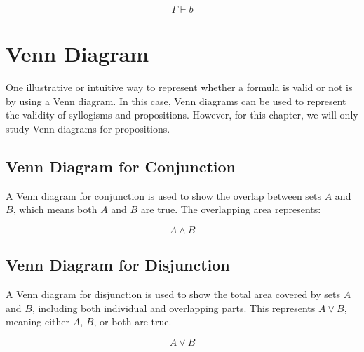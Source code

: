 \documentclass[12pt,a4paper,openany]{article}
\begin{document}
\[
\Gamma \vdash b
\]


\section{Venn Diagram}

One illustrative or intuitive way to represent whether a formula is valid or not is by using a Venn diagram. In this case, Venn diagrams can be used to represent the validity of syllogisms and propositions. However, for this chapter, we will only study Venn diagrams for propositions.

\subsection{Venn Diagram for Conjunction}\label{ven-diagram-for-conjunction}

A Venn diagram for conjunction is used to show the overlap between sets \(A\) and \(B\), which means both \(A\) and \(B\) are true. The overlapping area represents:

\[
A \wedge B
\]

\begin{center}
\end{center}

\subsection{Venn Diagram for Disjunction}\label{venn-diagram-for-disjunction}

A Venn diagram for disjunction is used to show the total area covered by sets \(A\) and \(B\), including both individual and overlapping parts. This represents \(A \vee B\), meaning either \(A\), \(B\), or both are true.

\[
A \vee B
\]

\begin{center}
\end{center}
\end{document}
